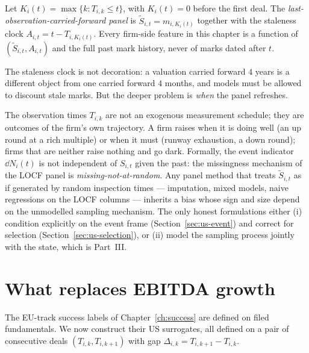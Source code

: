 \begin{definition}
\label{def:us-locf}
Let $K_i(t) = \max\{k : T_{i,k} \le t\}$, with $K_i(t) = 0$ before the first deal. The
\emph{last-observation-carried-forward panel} is $\tilde{S}_{i,t} = m_{i,K_i(t)}$ together
with the staleness clock $A_{i,t} = t - T_{i,K_i(t)}$. Every firm-side feature in this
chapter is a function of $(\tilde{S}_{i,t}, A_{i,t})$ and the full past mark history, never
of marks dated after $t$.
\end{definition}

The staleness clock is not decoration: a valuation carried forward $4$ years is a different
object from one carried forward $4$ months, and models must be allowed to discount stale
marks. But the deeper problem is \emph{when} the panel refreshes.

\begin{warning}
\label{warn:us-mnar}
The observation times $T_{i,k}$ are not an exogenous measurement schedule; they are outcomes
of the firm's own trajectory. A firm raises when it is doing well (an up round at a rich
multiple) or when it must (runway exhaustion, a down round); firms that are neither raise
nothing and go dark. Formally, the event indicator $\dd N_i(t)$ is not independent of
$S_{i,t}$ given the past: the missingness mechanism of the LOCF panel is
\emph{missing-not-at-random}. Any panel method that treats $\tilde{S}_{i,t}$ as if generated
by random inspection times --- imputation, mixed models, naive regressions on the LOCF
columns --- inherits a bias whose sign and size depend on the unmodelled sampling mechanism.
The only honest formulations either (i) condition explicitly on the event frame
(Section~\ref{sec:us-event}) and correct for selection (Section~\ref{sec:us-selection}), or
(ii) model the sampling process jointly with the state, which is Part~III.
\end{warning}

\section{What replaces EBITDA growth}
\label{sec:us-proxies}

The EU-track success labels of Chapter~\ref{ch:success} are defined on filed fundamentals.
We now construct their US surrogates, all defined on a pair of consecutive deals
$(T_{i,k}, T_{i,k+1})$ with gap $\Delta_{i,k} = T_{i,k+1} - T_{i,k}$.

